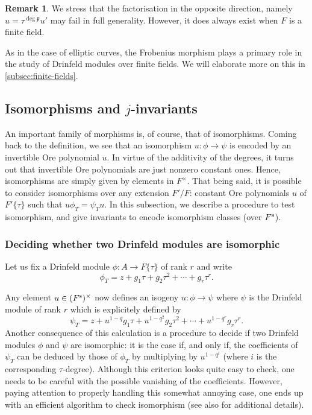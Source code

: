 \documentclass[11pt]{article}
\theoremstyle{definition}
\newtheorem{remark}[theorem]{Remark}
\newcommand{\pp}{\mathfrak{p}}
\newcommand{\Fs}{F^{\text{\rm s}}}
\begin{document}
\begin{remark}
We stress that the factorisation in the opposite direction, namely
$u = \tau^{\deg\pp} u'$ may fail in full generality.
However, it does always exist when $F$ is a finite field.
\end{remark}

As in the case of elliptic curves, the Frobenius morphism plays a 
primary role in the study of Drinfeld modules over finite fields.
We will elaborate more on this in \cref{subsec:finite-fields}.

\subsection{Isomorphisms and  \texorpdfstring{$j$}{j}-invariants}
\label{ssec:drinfeld:isomorphisms}

An important family of morphisms is, of course, that of isomorphisms.
Coming back to the definition, we see that an isomorphism $u: \phi
\to \psi$ is encoded by an invertible Ore polynomial $u$. In virtue of the additivity of the degrees, it turns out that
invertible Ore polynomials are just nonzero constant ones. Hence, isomorphisms 
are simply given by elements in $F^\times$. That being said, it is possible to
consider isomorphisms over any extension $F'/F$: constant Ore polynomials $u$ of
$F'\{\tau\}$ such that $u \phi_T = \psi_T u$. 
In this subsection, we describe a procedure to test
isomorphism, and give invariants to encode isomorphism classes (over $\Fs$).

\subsubsection{Deciding whether two Drinfeld modules are isomorphic}
\label{sssec:drinfeld:decideisom}

Let us fix a Drinfeld module $\phi : A \to F\{\tau\}$ of rank
$r$ and write $$\phi_T = z + g_1 \tau + g_2 \tau^2 + \cdots + g_r \tau^r.$$

Any element $u \in (\Fs)^\times$ now defines an isogeny $u : \phi \to \psi$ where
$\psi$ is the Drinfeld module of rank $r$ which is explicitely defined by
$$\psi_T = z + u^{1-q} g_1 \tau + u^{1-q^2} g_2 \tau^2 + \cdots + u^{1-q^r} g_r
\tau^r.$$ Another consequence of this calculation is a procedure to decide if two Drinfeld modules $\phi$ and $\psi$ are isomorphic: it is the case if, and only if, the coefficients of $\psi_T$ can be deduced by those of $\phi_T$ by
multiplying by $u^{1-q^i}$ (where $i$ is the corresponding $\tau$-degree).
Although this criterion looks quite easy to check, one needs to be careful with
the possible vanishing of the coefficients. However, paying attention to
properly handling this somewhat annoying case, one ends up with an efficient
algorithm to check isomorphism (see also
\cite[\S~3.2.3.5]{leudiere_morphisms_2024} for additional details). 
\end{document}
